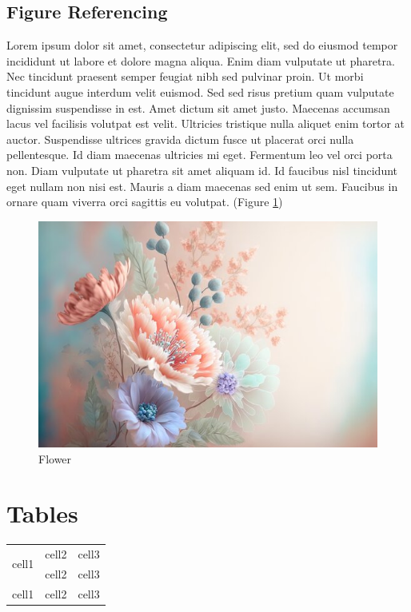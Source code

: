 \documentclass[a4paper, 12pt]{report}
\begin{document}
\section{Figure Referencing}
Lorem ipsum dolor sit amet, consectetur adipiscing elit, sed do eiusmod tempor incididunt ut labore et dolore magna aliqua. Enim diam vulputate ut pharetra. Nec tincidunt praesent semper feugiat nibh sed pulvinar proin. Ut morbi tincidunt augue interdum velit euismod. Sed sed risus pretium quam vulputate dignissim suspendisse in est. Amet dictum sit amet justo. Maecenas accumsan lacus vel facilisis volutpat est velit. Ultricies tristique nulla aliquet enim tortor at auctor. Suspendisse ultrices gravida dictum fusce ut placerat orci nulla pellentesque. Id diam maecenas ultricies mi eget. Fermentum leo vel orci porta non. Diam vulputate ut pharetra sit amet aliquam id. Id faucibus nisl tincidunt eget nullam non nisi est. Mauris a diam maecenas sed enim ut sem. Faucibus in ornare quam viverra orci sagittis eu volutpat. 
(Figure \ref{fig:sample_img_2})

\begin{figure}[!h]
	\includegraphics[width=\textwidth]{sample_img_2}
	\caption{Flower}
	\label{fig:sample_img_2}
\end{figure}



\chapter{Tables}
\begin{tabular}{|c|c|c|}
	\hline
	\multirow{2}{5em}{cell1} & cell2 & cell3 \\
	 & cell2 & cell3 \\
	\hline
	cell1 & cell2 & cell3 \\
	\hline
\end{tabular}
\end{document}
